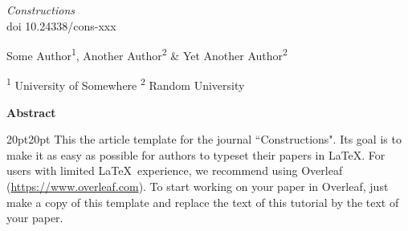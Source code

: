 \documentclass[]{constructions}
\begin{document}
\thispagestyle{plain}


\begin{flushright}
\small \textit{Constructions} \\
\small doi 10.24338/cons-xxx
\end{flushright}


\vspace{30pt}
\begin{center}
    \LARGE{}
\end{center}

\begin{center}
\vspace{4pt}
\large
    Some Author\textsuperscript{1}, Another Author\textsuperscript{2} \& Yet Another Author\textsuperscript{2}
    
\small
   \textsuperscript{1} University of Somewhere \textsuperscript{2} Random University 

\end{center}



\begin{small}
\begin{center}
\vspace{9pt}
\textbf{Abstract}    
\end{center}

\begin{adjustwidth}{20pt}{20pt}
\small \noindent This the article template for the journal ``Constructions". Its goal is to make it as easy as possible for authors to typeset their papers in \LaTeX. For users with limited \LaTeX \  experience, we recommend using Overleaf (\url{https://www.overleaf.com}). To start working on your paper in Overleaf, just make a copy of this template and replace the text of this tutorial by the text of your paper.
\end{adjustwidth}


\end{small}
\end{document}
